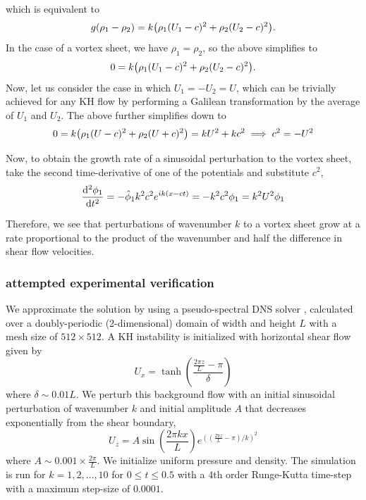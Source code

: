 \documentclass[10pt]{article}
\begin{document}
which is equivalent to
\begin{align}
    g(\rho_1 - \rho_2) = k\qty(\rho_1(U_1 - c)^2 + \rho_2(U_2-c)^2).
\end{align}
In the case of a vortex sheet, we have $\rho_1 = \rho_2$, so the above simplifies to
\begin{align}
    0 = k\qty(\rho_1(U_1 - c)^2 + \rho_2(U_2-c)^2).
\end{align}
Now, let us consider the case in which $U_1 = -U_2 = U$, which can be trivially achieved for any KH flow by performing a Galilean transformation by the average of $U_1$ and $U_2$. The above further simplifies down to
\begin{align}
    0 = k\qty(\rho_1(U - c)^2 + \rho_2(U + c)^2) = kU^2 + kc^2 \implies c^2 = -U^2
\end{align}

Now, to obtain the growth rate of a sinusoidal perturbation to the vortex sheet, take the second time-derivative of one of the potentials and substitute $c^2$,
\begin{align}
    \dv[2]{\phi_1}{t} = -\hat\phi_1k^2c^2e^{ik(x-ct)} = -k^2c^2\phi_1 = k^2U^2\phi_1
\end{align}

Therefore, we see that perturbations of wavenumber $k$ to a vortex sheet grow at a rate proportional to the product of the wavenumber and half the difference in shear flow velocities.

\subsubsection{attempted experimental verification}

We approximate the solution by using a pseudo-spectral DNS solver \citep{mortensen2016}, calculated over a doubly-periodic (2-dimensional) domain of width and height $L$ with a mesh size of $512\times512$. A KH instability is initialized with horizontal shear flow given by
\[U_x = \tanh(\frac{\frac{2\pi z}{L} - \pi}{\delta})\]
where $\delta \sim 0.01L$. We perturb this background flow with an initial sinusoidal perturbation of wavenumber $k$ and initial amplitude $A$ that decreases exponentially  from the shear boundary,
\[U_z = A\sin(\frac{2\pi k x}{L})e^{((\frac{2\pi z}{L}-\pi)/k)^2}\]
where $A \sim 0.001\times \frac{2\pi}{L}$. We initialize uniform pressure and density. The simulation is run for $k = 1, 2, \dots, 10$ for $0 \leq t \leq 0.5$ with a 4th order Runge-Kutta time-step with a maximum step-size of $0.0001$.
\end{document}
